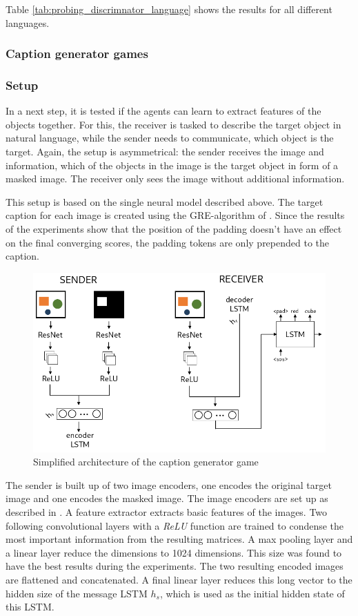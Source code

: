 Table \ref{tab:probing_discrimnator_language} shows the results for all different languages.


\subsubsection{Caption generator games}
\subsubsection*{Setup}

In a next step, it is tested if the agents can learn to extract features of the objects together.
For this, the receiver is tasked to describe the target object in natural language, while the sender needs to communicate, which object is the target.
Again, the setup is asymmetrical: the sender receives the image and information, which of the objects in the image is the target object in form of a masked image.
The receiver only sees the image without additional information.

This setup is based on the single neural model described above.
The target caption for each image is created using the GRE-algorithm of \citet{Dale1995}.
Since the results of the experiments show that the position of the padding doesn't have an effect on the final converging scores, the padding tokens are only prepended to the caption.

\begin{figure}[h]
    \centering
    \includegraphics[width=.7\linewidth]{figures/arch_caption_generator_game.png}
    \caption{Simplified architecture of the caption generator game}
    \label{fig:caption_generator_game_architecture}
\end{figure}

The sender is built up of two image encoders, one encodes the original target image and one encodes the masked image.
The image encoders are set up as described in \citet{Johnson2017}.
A feature extractor extracts basic features of the images.
Two following convolutional layers with a \emph{ReLU} function are trained to condense the most important information from the resulting matrices.
A max pooling layer and a linear layer reduce the dimensions to 1024 dimensions.
This size was found to have the best results during the experiments.
The two resulting encoded images are flattened and concatenated.
A final linear layer reduces this long vector to the hidden size of the message LSTM $h_s$, which is used as the initial hidden state of this LSTM.

